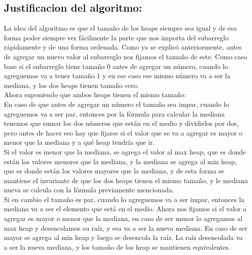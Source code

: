 \documentclass{article}
\begin{document}
		\subsection{Justificacion del algoritmo:}
		 La idea del algoritmo es que el tama\~no de los heaps siempre sea igual y de esa forma poder siempre ver f\'acilmente la parte que nos importa del subarreglo r\'apidamente y de una forma ordenada. Como ya se explic\'o anteriormente, antes de agregar un nuevo valor al subarreglo nos fijamos el tama\~no de este. Como caso base si el subarreglo tiene tama\~no 0 antes de agregar un n\'umero, cuando lo agreguemos va a tener tama\~no 1 y en ese caso ese mismo n\'umero va a ser la mediana, y los dos heaps tienen tama\~no cero.
		\\Ahora suponiendo que ambos heaps tienen el mismo tama\~no:
		\\ En caso de que antes de agregar un n\'umero el tama\~no sea impar, cuando lo agreguemos va a ser par, entonces por la f\'ormula para calcular la mediana tenemos que sumar los dos n\'umeros que est\'an en el medio y dividirlos por dos, pero antes de hacer eso hay que fijarse si el valor que se va a agregar es mayor o menor que la mediana y a qu\'e heap tendr\'ia que ir.
		\\Si el valor es menor que la mediana, se agrega el valor al max heap, que es donde est\'an los valores menores que la mediana, y la mediana se agrega al min heap, que es donde est\'an los valores mayores que la mediana, y de esta forma se mantiene el invariante de que los dos heaps tienen el mismo tamaño, y le mediana nueva se calcula con la f\'ormula previamente mencionada.
		\\ Si en cambio el tama\~no es par, cuando lo agreguemos va a ser impar, entonces la mediana va a ser el elemento que est\'a en el medio. Ahora nos fijamos si el valor a agregar es mayor o menor que la mediana, en caso de ser menor lo agregamos al max heap y desencolamos su ra\'iz, y esa va a ser la nueva mediana. En caso de ser mayor se agrega al min heap y luego se desencola la ra\'iz. La ra\'iz desencolada va a ser la nueva mediana, y los tama\~no de los heap se mantienen equivalentes.
\end{document}

